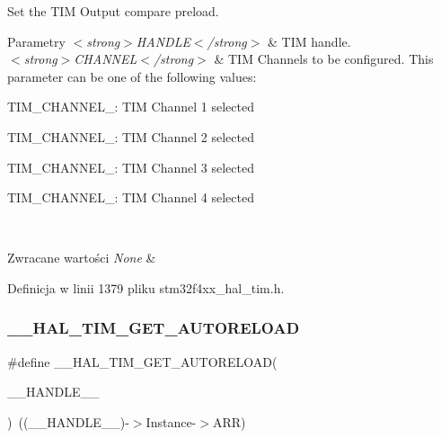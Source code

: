 Set the T\+IM Output compare preload. 


\begin{DoxyParams}{Parametry}
{\em $<$strong$>$\+H\+A\+N\+D\+L\+E$<$/strong$>$} & T\+IM handle. \\
\hline
{\em $<$strong$>$\+C\+H\+A\+N\+N\+E\+L$<$/strong$>$} & T\+IM Channels to be configured. This parameter can be one of the following values\+: \begin{DoxyItemize}
\item T\+I\+M\+\_\+\+C\+H\+A\+N\+N\+E\+L\+\_\+: T\+IM Channel 1 selected \item T\+I\+M\+\_\+\+C\+H\+A\+N\+N\+E\+L\+\_\+: T\+IM Channel 2 selected \item T\+I\+M\+\_\+\+C\+H\+A\+N\+N\+E\+L\+\_\+: T\+IM Channel 3 selected \item T\+I\+M\+\_\+\+C\+H\+A\+N\+N\+E\+L\+\_\+: T\+IM Channel 4 selected \end{DoxyItemize}
\\
\hline
\end{DoxyParams}

\begin{DoxyRetVals}{Zwracane wartości}
{\em None} & \\
\hline
\end{DoxyRetVals}


Definicja w linii 1379 pliku stm32f4xx\+\_\+hal\+\_\+tim.\+h.

\mbox{\label{group___t_i_m___exported___macros_gaa7a5c7645695bad15bacd402513a028a}} 
\subsubsection{\texorpdfstring{\+\_\+\+\_\+\+H\+A\+L\+\_\+\+T\+I\+M\+\_\+\+G\+E\+T\+\_\+\+A\+U\+T\+O\+R\+E\+L\+O\+AD}{\_\_HAL\_TIM\_GET\_AUTORELOAD}}
{\footnotesize\ttfamily \#define \+\_\+\+\_\+\+H\+A\+L\+\_\+\+T\+I\+M\+\_\+\+G\+E\+T\+\_\+\+A\+U\+T\+O\+R\+E\+L\+O\+AD(\begin{DoxyParamCaption}\item[{}]{\+\_\+\+\_\+\+H\+A\+N\+D\+L\+E\+\_\+\+\_\+ }\end{DoxyParamCaption})~((\+\_\+\+\_\+\+H\+A\+N\+D\+L\+E\+\_\+\+\_\+)-\/$>$Instance-\/$>$A\+RR)}




